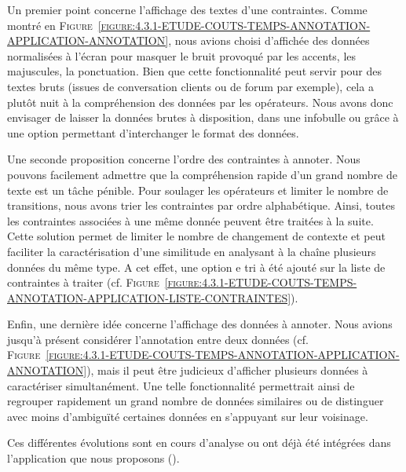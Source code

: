 			Un premier point concerne l'affichage des textes d'une contraintes.
			Comme montré en \textsc{Figure~\ref{figure:4.3.1-ETUDE-COUTS-TEMPS-ANNOTATION-APPLICATION-ANNOTATION}}, nous avions choisi d'affichée des données normalisées à l'écran pour masquer le bruit provoqué par les accents, les majuscules, la ponctuation.
			Bien que cette fonctionnalité peut servir pour des textes bruts (issues de conversation clients ou de forum par exemple), cela a plutôt nuit à la compréhension des données par les opérateurs.
			Nous avons donc envisager de laisser la données brutes à disposition, dans une infobulle ou grâce à une option permettant d'interchanger le format des données.
			
			Une seconde proposition concerne l'ordre des contraintes à annoter.
			Nous pouvons facilement admettre que la compréhension rapide d'un grand nombre de texte est un tâche pénible.
			Pour soulager les opérateurs et limiter le nombre de transitions, nous avons trier les contraintes par ordre alphabétique.
			Ainsi, toutes les contraintes associées à une même donnée peuvent être traitées à la suite.
			Cette solution permet de limiter le nombre de changement de contexte et peut faciliter la caractérisation d'une similitude en analysant à la chaîne plusieurs données du même type.
			A cet effet, une option e tri à été ajouté sur la liste de contraintes à traiter (cf. \textsc{Figure~\ref{figure:4.3.1-ETUDE-COUTS-TEMPS-ANNOTATION-APPLICATION-LISTE-CONTRAINTES}}).
			
			Enfin, une dernière idée concerne l'affichage des données à annoter.
			Nous avions jusqu'à présent considérer l'annotation entre deux données (cf. \textsc{Figure~\ref{figure:4.3.1-ETUDE-COUTS-TEMPS-ANNOTATION-APPLICATION-ANNOTATION}}), mais il peut être judicieux d'afficher plusieurs données à caractériser simultanément.
			Une telle fonctionnalité permettrait ainsi de regrouper rapidement un grand nombre de données similaires ou de distinguer avec moins d'ambiguïté certaines données en s'appuyant sur leur voisinage.
			
			\begin{leftBarInformation}
				Ces différentes évolutions sont en cours d'analyse ou ont déjà été intégrées dans l'application que nous proposons (\cite{schild-etal:2022:cognitivefactory-interactiveclusteringgui}).
			\end{leftBarInformation}
	

